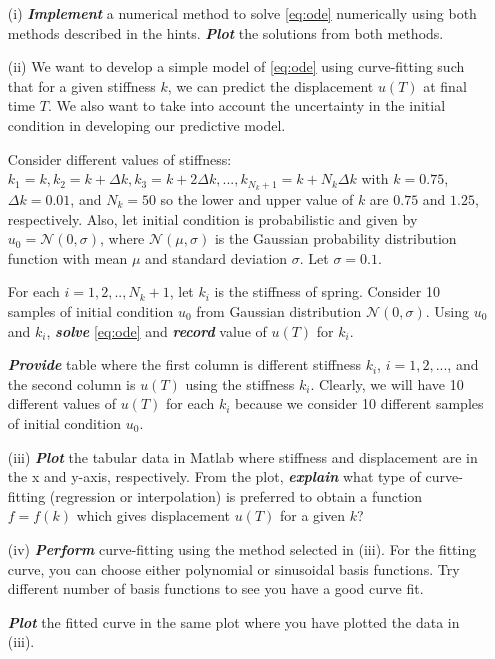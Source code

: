 \documentclass[11pt,a4paper]{article}
\newcommand{\bfit}[1]{\textit{\textbf{#1}}}
\begin{document}
\begin{itemize}
\item[(i)] \bfit{Implement} a numerical method to solve \eqref{eq:ode} numerically using both methods described in the hints. \bfit{Plot} the solutions from both methods. 
\item[(ii)] We want to develop a simple model of \eqref{eq:ode} using curve-fitting such that for a given stiffness $k$, we can predict the displacement $u(T)$ at final time $T$. We also want to take into account the uncertainty in the initial condition in developing our predictive model. 

Consider different values of stiffness: $k_1 = k, k_2 = k + \Delta k, k_3 = k + 2\Delta k, ..., k_{N_k + 1} = k + N_k \Delta k$ with $k = 0.75$, $\Delta k = 0.01$, and $N_k = 50$ so the lower and upper value of $k$ are $0.75$ and $1.25$, respectively. Also, let initial condition is probabilistic and given by $u_0 = \mathcal{N}(0, \sigma)$, where $\mathcal{N}(\mu, \sigma)$ is the Gaussian probability distribution function with mean $\mu$ and standard deviation $\sigma$. Let $\sigma = 0.1$. 

For each $i=1, 2, .., N_k + 1$, let $k_i$ is the stiffness of spring. Consider 10 samples of initial condition $u_0$ from Gaussian distribution $\mathcal{N}(0, \sigma)$. Using $u_0$ and $k_i$, \bfit{solve} \eqref{eq:ode} and \bfit{record} value of $u(T)$ for $k_i$. 

\bfit{Provide} table where the first column is different stiffness $k_i$, $i=1,2,...$, and the second column is $u(T)$ using the stiffness $k_i$. Clearly, we will have 10 different values of $u(T)$ for each $k_i$ because we consider 10 different samples of initial condition $u_0$. 

\item[(iii)] \bfit{Plot} the tabular data in Matlab where stiffness and displacement are in the x and y-axis, respectively. From the plot, \bfit{explain} what type of curve-fitting (regression or interpolation) is preferred to obtain a function $f = f(k)$ which gives displacement $u(T)$ for a given $k$? 

\item[(iv)] \bfit{Perform} curve-fitting using the method selected in (iii). For the fitting curve, you can choose either polynomial or sinusoidal basis functions. Try different number of basis functions to see you have a good curve fit.

\bfit{Plot} the fitted curve in the same plot where you have plotted the data in (iii). 


\end{itemize}
\end{document}
